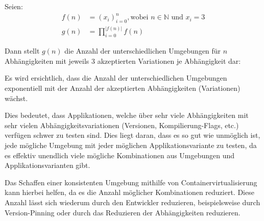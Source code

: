 Seien:
\begin{align*}
    f(n) &= (x_i)_{i=0}^{n}, \text{wobei } n \in \mathbb{N} \text{ und } x_i = 3 \\
    g(n) &= \prod_{i=0}^{|f(n)|} f(n)
\end{align*}

Dann stellt $g(n)$ die Anzahl der unterschiedlichen Umgebungen für $n$ Abhängigkeiten mit jeweils 3 akzeptierten Variationen je Abhängigkeit dar:


Es wird ersichtlich, dass die Anzahl der unterschiedlichen Umgebungen exponentiell mit der Anzahl der akzeptierten Abhängigkeiten (Variationen) wächst. 

Dies bedeutet, dass Applikationen, welche über sehr viele Abhängigkeiten mit sehr vielen Abhängigkeitsvariationen (Versionen, Kompilierung-Flags, etc.) verfügen schwer zu testen sind. Dies liegt daran, dass es so gut wie unmöglich ist, jede mögliche Umgebung mit jeder möglichen Applikationsvariante zu testen, da es effektiv unendlich viele mögliche Kombinationen aus Umgebungen und Applikationsvarianten gibt.

Das Schaffen einer konsistenten Umgebung mithilfe von Containervirtualisierung kann hierbei helfen, da es die Anzahl möglicher Kombinationen reduziert. Diese Anzahl lässt sich wiederum durch den Entwickler reduzieren, beispielsweise durch Version-Pinning oder durch das Reduzieren der Abhängigkeiten reduzieren.